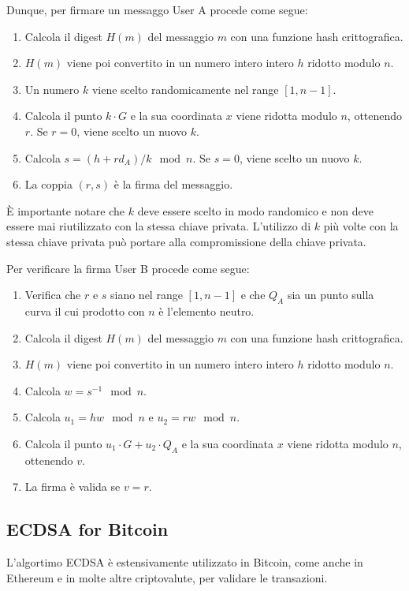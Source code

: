 \documentclass{article}
\begin{document}
Dunque, per firmare un messaggo User A procede come segue:
\begin{enumerate} %
	\item Calcola il digest $H(m)$ del messaggio $m$ con una funzione hash crittografica.
	\item $H(m)$ viene poi convertito in un numero intero intero $h$ ridotto modulo $n$.
	\item Un numero $k$ viene scelto randomicamente nel range $[1, n-1]$.
	\item Calcola il punto $k \cdot G$ e la sua coordinata $x$ viene ridotta modulo $n$, ottenendo $r$. Se $r = 0$, viene scelto un nuovo $k$.
	\item Calcola $s = (h + rd_A)/k \mod n$. Se $s = 0$, viene scelto un nuovo $k$.
	\item La coppia $(r, s)$ è la firma del messaggio.
\end{enumerate} %

È importante notare che $k$ deve essere scelto in modo randomico e non deve essere mai riutilizzato con la stessa chiave privata.
L'utilizzo di $k$ più volte con la stessa chiave privata può portare alla compromissione della chiave privata.

Per verificare la firma User B procede come segue:
\begin{enumerate} %
	\item Verifica che $r$ e $s$ siano nel range $[1, n-1]$ e che $Q_A$ sia un punto sulla curva il cui prodotto con $n$ è l'elemento neutro.
	\item Calcola il digest $H(m)$ del messaggio $m$ con una funzione hash crittografica.
	\item $H(m)$ viene poi convertito in un numero intero intero $h$ ridotto modulo $n$.
	\item Calcola $w = s^{-1} \mod n$.
	\item Calcola $u_1 = hw \mod n$ e $u_2 = rw \mod n$.
	\item Calcola il punto $u_1 \cdot G + u_2 \cdot Q_A$ e la sua coordinata $x$ viene ridotta modulo $n$, ottenendo $v$.
	\item La firma è valida se $v = r$.
\end{enumerate} %

\subsection{ECDSA for Bitcoin}
L'algortimo ECDSA è estensivamente utilizzato in Bitcoin, come anche in Ethereum e in molte altre criptovalute, per validare le transazioni.
\end{document}
